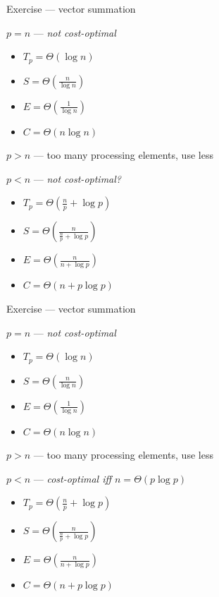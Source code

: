 \documentclass[10pt, t]{beamer}
\begin{document}
  \begin{frame}{Exercise --- vector summation}
    \addtocounter{framenumber}{-1}
    $p=n$ --- \emph{not cost-optimal}
    \begin{itemize}
      \item $T_p=\Theta(\log n)$
      \item $S=\Theta(\frac{n}{\log n})$
      \item $E=\Theta(\frac{1}{\log n})$
      \item $C=\Theta(n\log n)$
    \end{itemize}

    $p>n$ --- too many processing elements, use less

    $p<n$ --- \emph{not cost-optimal?}
    \begin{itemize}
      \item $T_p=\Theta(\frac{n}{p}+\log p)$
      \item $S=\Theta(\frac{n}{\frac{n}{p}+\log p})$
      \item $E=\Theta(\frac{n}{n+\log p})$
      \item $C=\Theta(n+p\log p)$
    \end{itemize}
  \end{frame}

  \begin{frame}{Exercise --- vector summation}
    \addtocounter{framenumber}{-1}
    $p=n$ --- \emph{not cost-optimal}
    \begin{itemize}
      \item $T_p=\Theta(\log n)$
      \item $S=\Theta(\frac{n}{\log n})$
      \item $E=\Theta(\frac{1}{\log n})$
      \item $C=\Theta(n\log n)$
    \end{itemize}

    $p>n$ --- too many processing elements, use less

    $p<n$ --- \emph{cost-optimal iff $n=\Theta(p\log p)$}
    \begin{itemize}
      \item $T_p=\Theta(\frac{n}{p}+\log p)$
      \item $S=\Theta(\frac{n}{\frac{n}{p}+\log p})$
      \item $E=\Theta(\frac{n}{n+\log p})$
      \item $C=\Theta(n+p\log p)$
    \end{itemize}
  \end{frame}
\end{document}
